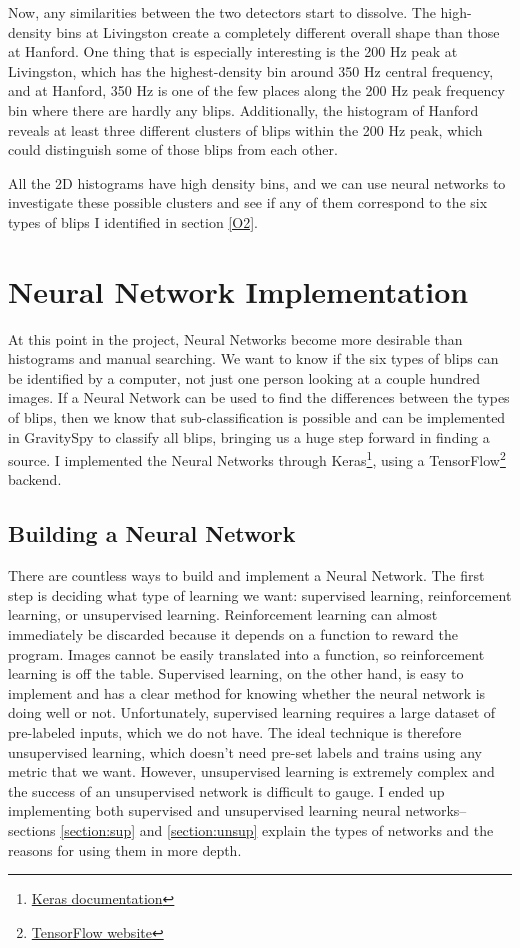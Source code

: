 \documentclass[a4paper]{article}
\begin{document}
Now, any similarities between the two detectors start to dissolve. The high-density bins at Livingston create a completely different overall shape than those at Hanford. One thing that is especially interesting is the 200 Hz peak at Livingston, which has the highest-density bin around 350 Hz central frequency, and at Hanford, 350 Hz is one of the few places along the 200 Hz peak frequency bin where there are hardly any blips. Additionally, the histogram of Hanford reveals at least three different clusters of blips within the 200 Hz peak, which could distinguish some of those blips from each other. 

All the 2D histograms have high density bins, and we can use neural networks to investigate these possible clusters and see if any of them correspond to the six types of blips I identified in section \ref{O2}. 

\section{Neural Network Implementation}

At this point in the project, Neural Networks become more desirable than histograms and manual searching. We want to know if the six types of blips can be identified by a computer, not just one person looking at a couple hundred images. If a Neural Network can be used to find the differences between the types of blips, then we know that sub-classification is possible and can be implemented in GravitySpy to classify all blips, bringing us a huge step forward in finding a source. I implemented the Neural Networks through Keras\footnote{\href{https://keras.io}{Keras documentation}}, using a TensorFlow\footnote{\href{https://www.tensorflow.org}{TensorFlow website}} backend.

\subsection{Building a Neural Network} \label{section:build_nn}

There are countless ways to build and implement a Neural Network. The first step is deciding what type of learning we want: supervised learning, reinforcement learning, or unsupervised learning. Reinforcement learning can almost immediately be discarded because it depends on a function to reward the program. Images cannot be easily translated into a function, so reinforcement learning is off the table. Supervised learning, on the other hand, is easy to implement and has a clear method for knowing whether the neural network is doing well or not. Unfortunately, supervised learning requires a large dataset of pre-labeled inputs, which we do not have. The ideal technique is therefore unsupervised learning, which doesn't need pre-set labels and trains using any metric that we want. However, unsupervised learning is extremely complex and the success of an unsupervised network is difficult to gauge. I ended up implementing both supervised and unsupervised learning neural networks--sections \ref{section:sup} and \ref{section:unsup} explain the types of networks and the reasons for using them in more depth.
\end{document}
